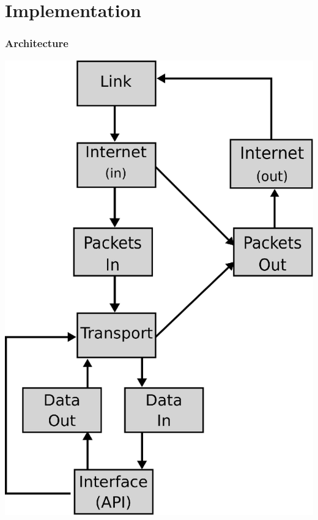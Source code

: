 \documentclass{beamer}
\begin{document}
\section{Implementation}
\begin{frame}
  \frametitle{Architecture}
  \begin{center}
    \includegraphics[scale=0.4]{graph}
  \end{center}


\end{frame}
\end{document}
